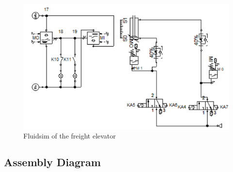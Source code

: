 \begin{figure}[H]
    \includegraphics[width=16cm]{Images/Q3/fluidsim_2.png}
    \centering
    \caption{Fluidsim of the freight elevator}
    \label{fig:fluidsim}
\end{figure}

\subsection{Assembly Diagram} \label{sec:Assembly_Diagram}


